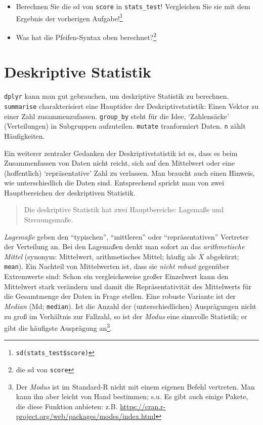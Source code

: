 \documentclass[12pt,ngerman,]{book}
\let\rmarkdownfootnote\footnote%
\def\footnote{\protect\rmarkdownfootnote}
\theoremstyle{definition}
\theoremstyle{definition}
\theoremstyle{remark}
\begin{document}
\begin{itemize}
\item
  Berechnen Sie die sd von \texttt{score} in \texttt{stats\_test}!
  Vergleichen Sie sie mit dem Ergebnis der vorherigen Aufgabe!\footnote{\texttt{sd(stats\_test\$score)}}
\item
  Was hat die Pfeifen-Syntax oben berechnet?\footnote{die sd von
    \texttt{score}}
\end{itemize}

\section{Deskriptive Statistik}\label{deskriptive-statistik}

\texttt{dplyr} kann man gut gebrauchen, um deskriptive Statistik zu
berechnen. \texttt{summarise} charakterisiert eine Hauptidee der
Deskriptivstatistik: Einen Vektor zu einer Zahl zusammenzufassen.
\texttt{group\_by} steht für die Idee, `Zahlensäcke' (Verteilungen) in
Subgruppen aufzuteilen. \texttt{mutate} tranformiert Daten. \texttt{n}
zählt Häufigkeiten.

Ein weiterer zentraler Gedanken der Deskriptivstatistik ist es, dass es
beim Zusammenfassen von Daten nicht reicht, sich auf den Mittelwert oder
eine (hoffentlich) `repräsentative' Zahl zu verlassen. Man braucht auch
einen Hinweis, wie unterschiedlich die Daten sind. Entsprechend spricht
man von zwei Hauptbereichen der deskriptiven Statistik.

\begin{quote}
Die deskriptive Statistik hat zwei Hauptbereiche: Lagemaße und
Streuungsmaße.
\end{quote}

\emph{Lagemaße} geben den ``typischen'', ``mittleren'' oder
``repräsentativen'' Vertreter der Verteilung an. Bei den
Lagemaßen denkt man sofort an das \emph{arithmetische
Mittel} (synonym: Mittelwert, arithmetisches Mittel; häufig als
\(\bar{X}\) abgekürzt; \texttt{mean}). Ein Nachteil von Mittelwerten
ist, dass sie \emph{nicht robust} gegenüber Extremwerte sind: Schon ein
vergleichsweise großer Einzelwert kann den Mittelwert stark verändern
und damit die Repräsentativität des Mittelwerts für die Gesamtmenge der
Daten in Frage stellen. Eine robuste Variante ist der \emph{Median} (Md;
\texttt{median}). Ist die Anzahl der (unterschiedlichen) Ausprägungen
nicht zu groß im Verhältnis zur Fallzahl, so ist der \emph{Modus} eine
sinnvolle Statistik; er gibt die häufigste Ausprägung an\footnote{Der
  \emph{Modus} ist im Standard-R nicht mit einem eigenen Befehl
  vertreten. Man kann ihn aber leicht von Hand bestimmen; s.u. Es gibt
  auch einige Pakete, die diese Funktion anbieten: z.B.
  \url{https://cran.r-project.org/web/packages/modes/index.html}}.
\end{document}
